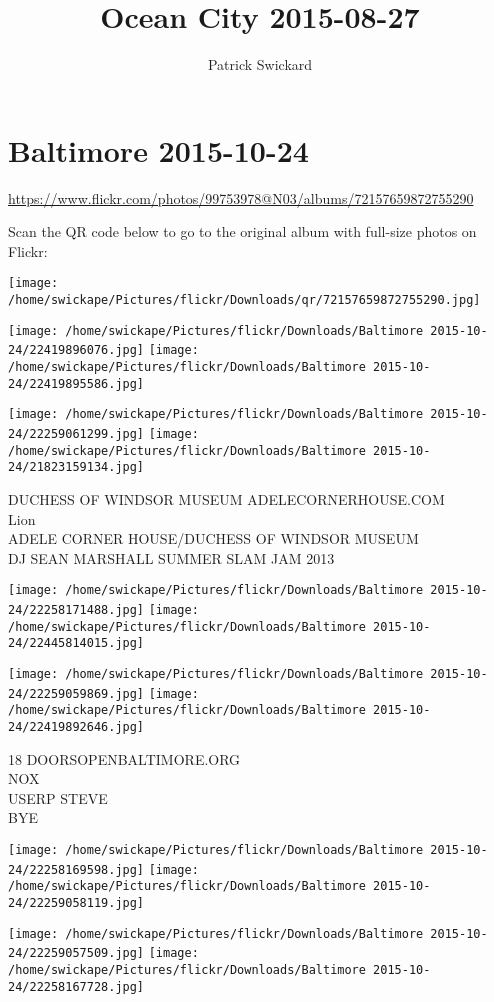 \documentclass[10pt,letterpaper]{article}
\title{Ocean City 2015-08-27}
\author{Patrick Swickard}
\date{}
\begin{document}
\section*{Baltimore 2015-10-24}

\url{https://www.flickr.com/photos/99753978@N03/albums/72157659872755290}

Scan the QR code below to go to the original album with full-size photos on Flickr:

\texttt{[image: /home/swickape/Pictures/flickr/Downloads/qr/72157659872755290.jpg]}
\pagebreak

\texttt{[image: /home/swickape/Pictures/flickr/Downloads/Baltimore 2015-10-24/22419896076.jpg]}
\texttt{[image: /home/swickape/Pictures/flickr/Downloads/Baltimore 2015-10-24/22419895586.jpg]}

\texttt{[image: /home/swickape/Pictures/flickr/Downloads/Baltimore 2015-10-24/22259061299.jpg]}
\texttt{[image: /home/swickape/Pictures/flickr/Downloads/Baltimore 2015-10-24/21823159134.jpg]}

DUCHESS OF WINDSOR MUSEUM ADELECORNERHOUSE.COM\\
Lion\\
ADELE CORNER HOUSE/DUCHESS OF WINDSOR MUSEUM\\
DJ SEAN MARSHALL SUMMER SLAM JAM 2013
\pagebreak

\texttt{[image: /home/swickape/Pictures/flickr/Downloads/Baltimore 2015-10-24/22258171488.jpg]}
\texttt{[image: /home/swickape/Pictures/flickr/Downloads/Baltimore 2015-10-24/22445814015.jpg]}

\texttt{[image: /home/swickape/Pictures/flickr/Downloads/Baltimore 2015-10-24/22259059869.jpg]}
\texttt{[image: /home/swickape/Pictures/flickr/Downloads/Baltimore 2015-10-24/22419892646.jpg]}

18 DOORSOPENBALTIMORE.ORG\\
NOX\\
USERP STEVE\\
BYE
\pagebreak

\texttt{[image: /home/swickape/Pictures/flickr/Downloads/Baltimore 2015-10-24/22258169598.jpg]}
\texttt{[image: /home/swickape/Pictures/flickr/Downloads/Baltimore 2015-10-24/22259058119.jpg]}

\texttt{[image: /home/swickape/Pictures/flickr/Downloads/Baltimore 2015-10-24/22259057509.jpg]}
\texttt{[image: /home/swickape/Pictures/flickr/Downloads/Baltimore 2015-10-24/22258167728.jpg]}
\end{document}
